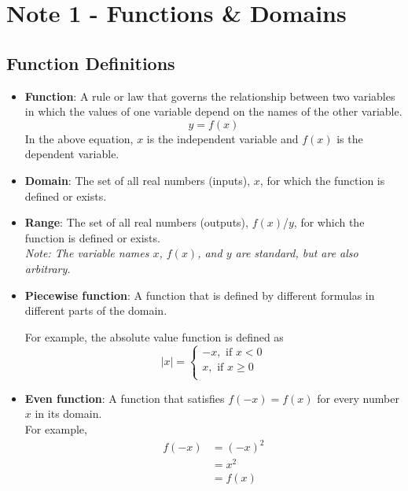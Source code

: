 \documentclass[10pt]{article}
\author{}
\date{}
\begin{document}
\section*{\centering Note 1 - Functions \& Domains}

\subsection*{Function Definitions}

\begin{itemize}
    \item \textbf{Function}: A rule or law that governs the relationship between two variables in which the values of one variable depend on the names of the other variable.
    $$y = f(x)$$
    In the above equation, {\color{blue}$x$} is the {\color{blue}independent variable} and {\color{red}$f(x)$} is the {\color{red}dependent variable}.
    \item \textbf{Domain}: The set of all real numbers (inputs), {\color{blue}$x$}, for which the function is defined or exists.
    \item \textbf{Range}: The set of all real numbers (outputs), {\color{red}$f(x)$/$y$}, for which the function is defined or exists.\\
    \textit{Note: The variable names {\color{blue}$x$}, {\color{red}$f(x)$}, and {\color{red}$y$} are standard, but are also arbitrary.}
    \item \textbf{Piecewise function}: A function that is defined by different formulas in different parts of the domain.

    For example, the absolute value function is defined as
    $$ |x| = \begin{cases}
        -x, \text{ if } x < 0 \\
        x, \text{ if } x \geq 0 \\
        \end{cases}$$
    \item \textbf{Even function}: A function that satisfies $f(-x) = f(x)$ for every number $x$ in its domain.\\
    For example, 
    \begin{align*}
    f(-x) &= (-x)^2 \\ &= x^2 \\ &= f(x)
    \end{align*}
    

\end{itemize}
\end{document}
